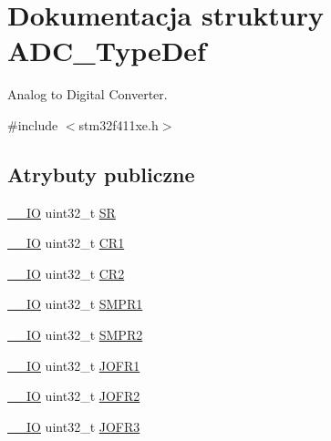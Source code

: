 \hypertarget{struct_a_d_c___type_def}{}\section{Dokumentacja struktury A\+D\+C\+\_\+\+Type\+Def}
\label{struct_a_d_c___type_def}


Analog to Digital Converter.  




{\ttfamily \#include $<$stm32f411xe.\+h$>$}

\subsection*{Atrybuty publiczne}
\begin{DoxyCompactItemize}
\item 
\hyperlink{core__sc300_8h_aec43007d9998a0a0e01faede4133d6be}{\+\_\+\+\_\+\+IO} uint32\+\_\+t \hyperlink{struct_a_d_c___type_def_a9745df96e98f3cdc2d05ccefce681f64}{SR}
\item 
\hyperlink{core__sc300_8h_aec43007d9998a0a0e01faede4133d6be}{\+\_\+\+\_\+\+IO} uint32\+\_\+t \hyperlink{struct_a_d_c___type_def_a89b1ff4376683dd2896ea8b32ded05b2}{C\+R1}
\item 
\hyperlink{core__sc300_8h_aec43007d9998a0a0e01faede4133d6be}{\+\_\+\+\_\+\+IO} uint32\+\_\+t \hyperlink{struct_a_d_c___type_def_a1053a65a21af0d27afe1bf9cf7b7aca7}{C\+R2}
\item 
\hyperlink{core__sc300_8h_aec43007d9998a0a0e01faede4133d6be}{\+\_\+\+\_\+\+IO} uint32\+\_\+t \hyperlink{struct_a_d_c___type_def_a73009a8122fcc628f467a4e997109347}{S\+M\+P\+R1}
\item 
\hyperlink{core__sc300_8h_aec43007d9998a0a0e01faede4133d6be}{\+\_\+\+\_\+\+IO} uint32\+\_\+t \hyperlink{struct_a_d_c___type_def_a9e68fe36c4c8fbbac294b5496ccf7130}{S\+M\+P\+R2}
\item 
\hyperlink{core__sc300_8h_aec43007d9998a0a0e01faede4133d6be}{\+\_\+\+\_\+\+IO} uint32\+\_\+t \hyperlink{struct_a_d_c___type_def_aa005e656f528aaad28d70d61c9db9b81}{J\+O\+F\+R1}
\item 
\hyperlink{core__sc300_8h_aec43007d9998a0a0e01faede4133d6be}{\+\_\+\+\_\+\+IO} uint32\+\_\+t \hyperlink{struct_a_d_c___type_def_aa20f76044c11042dde41c1060853fb82}{J\+O\+F\+R2}
\item 
\hyperlink{core__sc300_8h_aec43007d9998a0a0e01faede4133d6be}{\+\_\+\+\_\+\+IO} uint32\+\_\+t \hyperlink{struct_a_d_c___type_def_ae9c78142f6edf8122384263878d09015}{J\+O\+F\+R3}

\end{DoxyCompactItemize}

